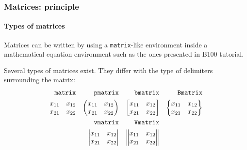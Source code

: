\documentclass[11pt]{beamer}
\begin{document}
\begin{frame}
	\frametitle{Matrices: principle}
	\framesubtitle{Types of matrices}
	
	Matrices can be written by using a \texttt{matrix}-like environment inside a mathematical equation environment such as the ones presented in B100 tutorial.
	
	Several types of matrices exist.
	They differ with the type of delimiters surrounding the matrix:
	\begin{align*}
		\text{\texttt{matrix}} && \text{\texttt{pmatrix}} && \text{\texttt{bmatrix}} && \text{\texttt{Bmatrix}} \\
		\begin{matrix}
			x_{11} & x_{12} \\
			x_{21} & x_{22} \\
		\end{matrix} 
		&&
		\begin{pmatrix}
			x_{11} & x_{12} \\
			x_{21} & x_{22} \\
		\end{pmatrix}
		&&
		\begin{bmatrix}
			x_{11} & x_{12} \\
			x_{21} & x_{22} \\
		\end{bmatrix}
		&&
		\begin{Bmatrix}
			x_{11} & x_{12} \\
			x_{21} & x_{22} \\
		\end{Bmatrix} \\
		&& \text{\texttt{vmatrix}} && \text{\texttt{Vmatrix}} && \\
		&&
		\begin{vmatrix}
			x_{11} & x_{12} \\
			x_{21} & x_{22} \\
		\end{vmatrix}
		&&
		\begin{Vmatrix}
			x_{11} & x_{12} \\
			x_{21} & x_{22} \\
		\end{Vmatrix}
		&& \\
	\end{align*}
\end{frame}
\end{document}
